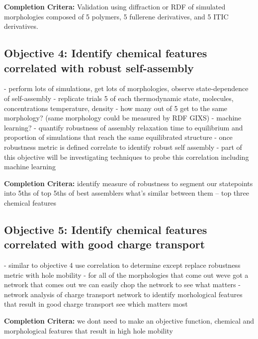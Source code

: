 \textbf{Completion Critera:} 
Validation using diffraction or RDF of simulated morphologies composed of 5 polymers, 5 fullerene derivatives, and 5 ITIC derivatives. 

\subsection*{Objective 4: Identify chemical features correlated with robust self-assembly}

- perform lots of simulations, get lots of morphologies, observe state-dependence of self-assembly
- replicate trials 5 of each thermodynamic state, molecules, concentrations temperature, density
- how many out of 5 get to the same morphology? (same morphology could be measured by RDF GIXS)
- machine learning?
- quantify robustness of assembly relaxation time to equilibrium and proportion of simulations that reach the same equilibrated structure
- once robustness metric is defined correlate to identify robust self assembly
- part of this objective will be investigating techniques to probe this correlation including machine learning

\textbf{Completion Critera:} identify measure of robustness to segment our statepoints into 5ths of top 5ths of best assemblers what's similar between them -- top three chemical features

\subsection*{Objective 5: Identify chemical features correlated with good charge transport}

- similar to objective 4 use correlation to determine except replace robustness metric with hole mobility 
- for all of the morphologies that come out weve got a network that comes out we can easily chop the network to see what matters
- network analysis of charge transport network to identify morhological features that result in good charge transport see which matters most

\textbf{Completion Critera:} we dont need to make an objective function, chemical and morphological features that result in high hole mobility

